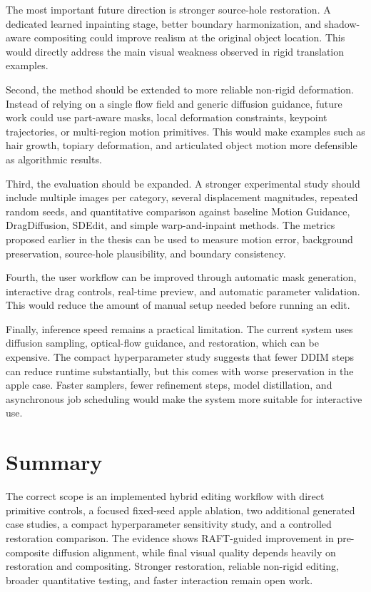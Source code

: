 The most important future direction is stronger source-hole restoration. A dedicated learned inpainting stage, better boundary harmonization, and shadow-aware compositing could improve realism at the original object location. This would directly address the main visual weakness observed in rigid translation examples.

Second, the method should be extended to more reliable non-rigid deformation. Instead of relying on a single flow field and generic diffusion guidance, future work could use part-aware masks, local deformation constraints, keypoint trajectories, or multi-region motion primitives. This would make examples such as hair growth, topiary deformation, and articulated object motion more defensible as algorithmic results.

Third, the evaluation should be expanded. A stronger experimental study should include multiple images per category, several displacement magnitudes, repeated random seeds, and quantitative comparison against baseline Motion Guidance, DragDiffusion, SDEdit, and simple warp-and-inpaint methods. The metrics proposed earlier in the thesis can be used to measure motion error, background preservation, source-hole plausibility, and boundary consistency.

Fourth, the user workflow can be improved through automatic mask generation, interactive drag controls, real-time preview, and automatic parameter validation. This would reduce the amount of manual setup needed before running an edit.

Finally, inference speed remains a practical limitation. The current system uses diffusion sampling, optical-flow guidance, and restoration, which can be expensive. The compact hyperparameter study suggests that fewer DDIM steps can reduce runtime substantially, but this comes with worse preservation in the apple case. Faster samplers, fewer refinement steps, model distillation, and asynchronous job scheduling would make the system more suitable for interactive use.

\section{Summary}

The correct scope is an implemented hybrid editing workflow with direct primitive controls, a focused fixed-seed apple ablation, two additional generated case studies, a compact hyperparameter sensitivity study, and a controlled restoration comparison. The evidence shows RAFT-guided improvement in pre-composite diffusion alignment, while final visual quality depends heavily on restoration and compositing. Stronger restoration, reliable non-rigid editing, broader quantitative testing, and faster interaction remain open work.
